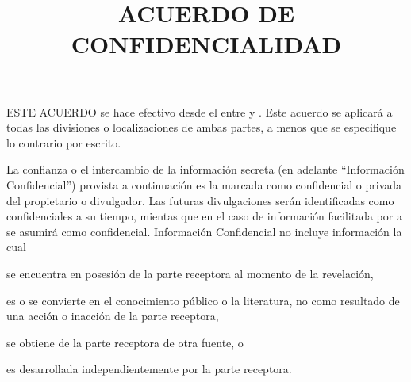 \documentclass[a4paper,twocolumn]{report}
\title{ACUERDO DE CONFIDENCIALIDAD}
\begin{document}
\maketitle
\pagestyle{empty}

ESTE ACUERDO se hace efectivo desde el {\startDate} entre {\receiver} y {\owner}. Este acuerdo se aplicará a todas las divisiones o localizaciones de ambas partes, a menos que se especifique lo contrario por escrito.

\setlength{\itemindent}{0pt}
{\setlength{\leftmargini}{0pt} 
\begin{description}
\setlength{\leftmargin}{\rightmargin}
\setlength{\itemindent}{0pt}
\setlength{\itemsep}{8pt}

\item[1. Definiciones] La confianza o el intercambio de la información secreta (en adelante ``Información Confidencial'') provista a continuación es la marcada como confidencial o privada del propietario o divulgador. Las futuras divulgaciones serán identificadas como confidenciales a su tiempo, mientas que en el caso de información facilitada por {\owner} a {\receiver} se asumirá como confidencial. Información Confidencial no incluye información la cual
\begin{inparaenum}[(i)]
\item se encuentra en posesión de la parte receptora al momento de la revelación, 
\item es o se convierte en el conocimiento público o la literatura, no como resultado de una acción o inacción de la parte receptora, 
\item se obtiene de la parte receptora de otra fuente, o
\item es desarrollada independientemente por la parte receptora.
\end{inparaenum}
      

\end{description}}
\end{document}
